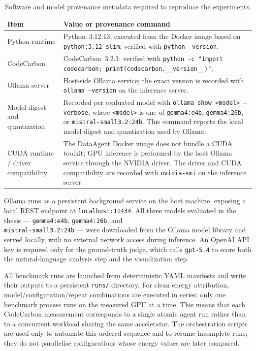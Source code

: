 \begin{table}[H]
\centering
{}
\begin{tabularx}{\textwidth}{|l|X|}
\hline
\rowcolor{bluePoli!30}
\textbf{Item} & \textbf{Value or provenance command} \T\B \\
\hline
Python runtime & Python~3.12.13, executed from the Docker image based on
\texttt{python:3.12-slim}; verified with \texttt{python --version}. \T\B \\
\hline
CodeCarbon & CodeCarbon~3.2.1; verified with
\texttt{python -c "import codecarbon; print(codecarbon.\_\_version\_\_)"}. \T\B \\
\hline
Ollama server & Host-side Ollama service; the exact version is recorded with
\texttt{ollama --version} on the inference server. \T\B \\
\hline
Model digest and quantization & Recorded per evaluated model with
\texttt{ollama show <model> --verbose}, where \texttt{<model>} is one of
\texttt{gemma4:e4b}, \texttt{gemma4:26b}, or
\texttt{mistral-small3.2:24b}. This command reports the local model digest and
quantization used by Ollama. \T\B \\
\hline
CUDA runtime / driver compatibility & The DataAgent Docker image does not
bundle a CUDA toolkit; GPU inference is performed by the host Ollama service
through the NVIDIA driver. The driver and CUDA compatibility are recorded with
\texttt{nvidia-smi} on the inference server. \T\B \\
\hline
\end{tabularx}
\caption{Software and model provenance metadata required to reproduce the experiments.}
\label{tab:reproducibility_metadata}
\end{table}

Ollama runs as a persistent background service on the host machine, exposing a
local REST endpoint at \texttt{localhost:11434}. All three models evaluated in
the thesis --- \texttt{gemma4:e4b}, \texttt{gemma4:26b}, and \\
\texttt{mistral-small3.2:24b} --- were downloaded from the Ollama model library
and served locally, with no external network access during inference. An OpenAI
API key is required only for the ground-truth judge, which calls
\texttt{gpt-5.4} to score both the natural-language analysis step and the
visualization step.

All benchmark runs are launched from deterministic YAML manifests and write
their outputs to a persistent \texttt{runs/} directory. For clean energy
attribution, model/configuration/repeat combinations are executed in series:
only one benchmark process runs on the measured GPU at a time. This means that
each CodeCarbon measurement corresponds to a single atomic agent run rather
than to a concurrent workload sharing the same accelerator. The orchestration
scripts are used only to automate this ordered sequence and to resume incomplete
runs; they do not parallelise configurations whose energy values are later
compared.

